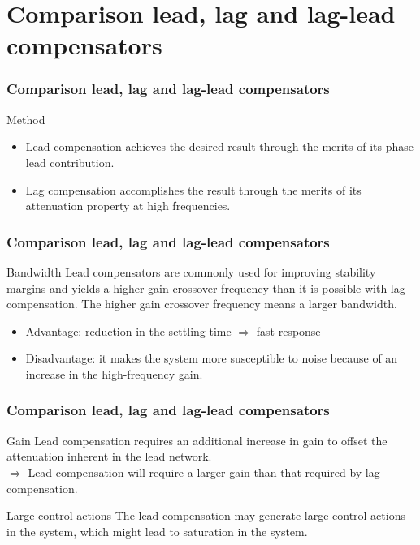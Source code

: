 \section{Comparison lead, lag and lag-lead compensators}

\begin{frame}
\frametitle{Comparison lead, lag and lag-lead compensators}
\begin{block}{Method}
\begin{itemize}
\item Lead compensation achieves the desired result through the merits of its phase lead
contribution.
\item Lag compensation accomplishes the result through the merits of its attenuation property at high frequencies.
\end{itemize}
\end{block}
\end{frame}

\begin{frame}
\frametitle{Comparison lead, lag and lag-lead compensators}
\begin{block}{Bandwidth}
Lead compensators are commonly used for improving stability margins and yields a higher gain crossover frequency than it is possible with lag compensation. The higher gain crossover frequency means a larger bandwidth.
\begin{itemize}
\item Advantage: reduction in the settling time $\Rightarrow$ fast response
\item Disadvantage: it makes the system more susceptible to noise because of
an increase in the high-frequency gain. 
\end{itemize}
\end{block}
\end{frame}

\begin{frame}
\frametitle{Comparison lead, lag and lag-lead compensators}
\begin{block}{Gain}
Lead compensation requires an additional increase in gain to offset the attenuation
inherent in the lead network. \\
$\Rightarrow$ Lead compensation will require
a larger gain than that required by lag compensation.
\end{block}
\begin{block}{Large control actions}
The lead compensation may generate large control actions in the system, which might lead to saturation in the system.
\end{block}
\end{frame}

